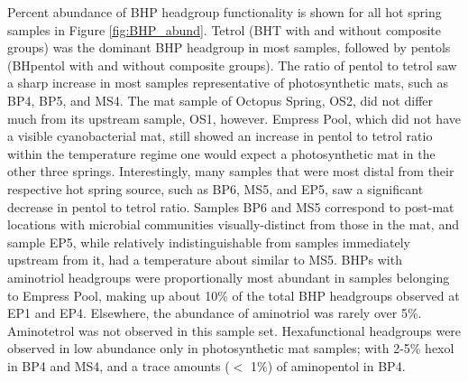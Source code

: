 Percent abundance of BHP headgroup functionality is shown for all hot spring samples in Figure \ref{fig:BHP_abund}. Tetrol (BHT with and without composite groups) was the dominant BHP headgroup in most samples, followed by pentols (BHpentol with and without composite groups). The ratio of pentol to tetrol saw a sharp increase in most samples representative of photosynthetic mats, such as BP4, BP5, and MS4. The mat sample of Octopus Spring, OS2, did not differ much from its upstream sample, OS1, however. Empress Pool, which did not have a visible cyanobacterial mat, still showed an increase in pentol to tetrol ratio within the temperature regime one would expect a photosynthetic mat in the other three springs. Interestingly, many samples that were most distal from their respective hot spring source, such as BP6, MS5, and EP5, saw a significant decrease in pentol to tetrol ratio. Samples BP6 and MS5 correspond to post-mat locations with microbial communities visually-distinct from those in the mat, and sample EP5, while relatively indistinguishable from samples immediately upstream from it, had a temperature about similar to MS5. BHPs with aminotriol headgroups were proportionally most abundant in samples belonging to Empress Pool, making up about 10\% of the total BHP headgroups observed at EP1 and EP4. Elsewhere, the abundance of aminotriol was rarely over 5\%. Aminotetrol was not observed in this sample set. Hexafunctional headgroups were observed in low abundance only in photosynthetic mat samples; with 2-5\% hexol in BP4 and MS4, and a trace amounts ($<$ 1\%) of aminopentol in BP4.

